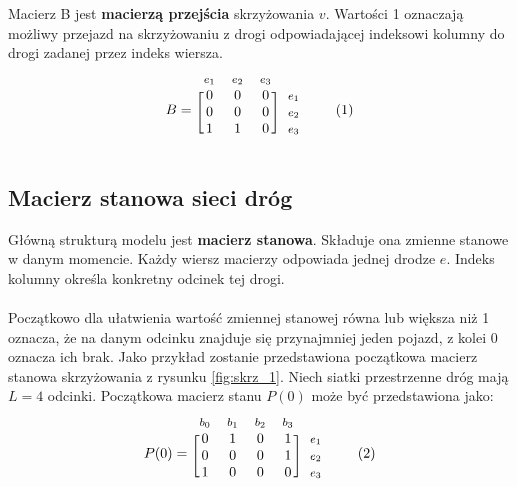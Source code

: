 \documentclass[12pt]{book}
\newcommand\addtag{\refstepcounter{equation}
\tag{\theequation}}
\begin{document}
Macierz B jest \textbf{macierzą przejścia} skrzyżowania $v$. Wartości 1 oznaczają możliwy przejazd na skrzyżowaniu z drogi odpowiadającej indeksowi kolumny do drogi zadanej przez indeks wiersza.
\begin{equation*}
  B=
  \begin{blockarray}{*{3}{c} l}
    \begin{block}{*{3}{>{$\footnotesize}c<{$}} l}
     $e_1$ & $e_2$ & $e_3$\\
    \end{block}
    \begin{block}{[*{3}{c}]>{$\footnotesize}l<{$}}
       0 & 0 & 0 & $e_1$ \\
       0 & 0 & 0 & $e_2$ \\
       1 & 1 & 0 & $e_3$ \\
    \end{block}
  \end{blockarray} \addtag
\end{equation*}




\subsection{Macierz stanowa sieci dróg}
Główną strukturą modelu jest \textbf{macierz stanowa}. Składuje ona zmienne stanowe w danym momencie. Każdy wiersz macierzy odpowiada jednej drodze $e$. Indeks kolumny określa konkretny odcinek tej drogi. \\ \\ Początkowo dla ułatwienia wartość zmiennej stanowej równa lub większa niż 1 oznacza, że na danym odcinku znajduje się przynajmniej jeden pojazd, z kolei 0 oznacza ich brak. Jako przykład zostanie przedstawiona początkowa macierz stanowa skrzyżowania z rysunku \ref{fig:skrz_1}. Niech siatki przestrzenne dróg mają $L=4$ odcinki. Początkowa macierz stanu $P(0)$ może być przedstawiona jako:
\begin{equation*}
  P(0)=
  \begin{blockarray}{*{4}{c} l}
    \begin{block}{*{4}{>{$\footnotesize}c<{$}} l}
      $b_0$ & $b_1$ & $b_2$ & $b_3$ \\
    \end{block}
    \begin{block}{[*{4}{c}]>{$\footnotesize}l<{$}}
       0 & 1 & 0 & 1 & $e_1$ \\
       0 & 0 & 0 & 1 & $e_2$ \\
       1 & 0 & 0 & 0 & $e_3$ \\
    \end{block}
  \end{blockarray} \addtag \label{skrz_1_x0}
\end{equation*}
\end{document}
